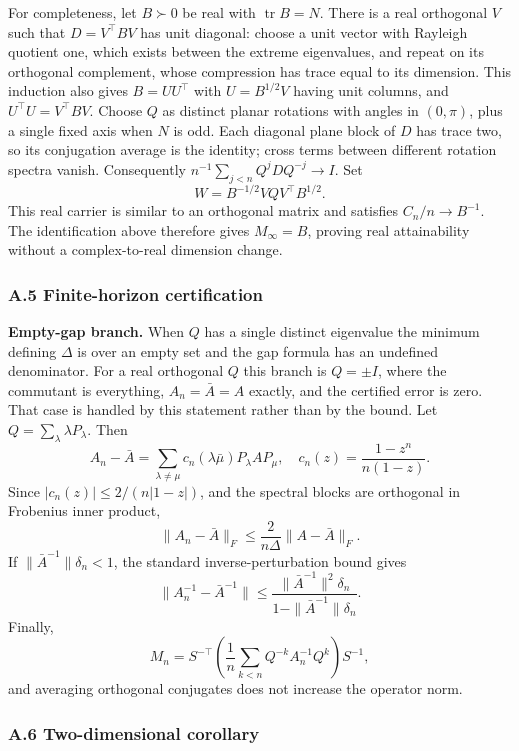 \documentclass[
  10pt,
]{article}
\begin{document}
For completeness, let \(B\succ0\) be real with \(\operatorname{tr}B=N\).
There is a real orthogonal \(V\) such that \(D=V^\top BV\) has unit
diagonal: choose a unit vector with Rayleigh quotient one, which exists
between the extreme eigenvalues, and repeat on its orthogonal
complement, whose compression has trace equal to its dimension. This
induction also gives \(B=UU^\top\) with \(U=B^{1/2}V\) having unit
columns, and \(U^\top U=V^\top BV\). Choose \(Q\) as distinct planar
rotations with angles in \((0,\pi)\), plus a single fixed axis when
\(N\) is odd. Each diagonal plane block of \(D\) has trace two, so its
conjugation average is the identity; cross terms between different
rotation spectra vanish. Consequently
\(n^{-1}\sum_{j<n}Q^jD Q^{-j}\to I\). Set \[
W=B^{-1/2}VQV^\top B^{1/2}.
\] This real carrier is similar to an orthogonal matrix and satisfies
\(C_n/n\to B^{-1}\). The identification above therefore gives
\(M_\infty=B\), proving real attainability without a complex-to-real
dimension change.

\subsubsection{A.5 Finite-horizon
certification}\label{a.5-finite-horizon-certification}

\textbf{Empty-gap branch.} When \(Q\) has a single distinct eigenvalue
the minimum defining \(\Delta\) is over an empty set and the gap formula
has an undefined denominator. For a real orthogonal \(Q\) this branch is
\(Q=\pm I\), where the commutant is everything, \(A_n=\bar A=A\)
exactly, and the certified error is zero. That case is handled by this
statement rather than by the bound. Let
\(Q=\sum_\lambda\lambda P_\lambda\). Then \[
A_n-\bar A
=
\sum_{\lambda\ne\mu}
c_n(\lambda\bar\mu)P_\lambda A P_\mu,
\quad
c_n(z)=\frac{1-z^n}{n(1-z)}.
\] Since \(|c_n(z)|\le2/(n|1-z|)\), and the spectral blocks are
orthogonal in Frobenius inner product, \[
\|A_n-\bar A\|_F
\le
\frac{2}{n\Delta}\|A-\bar A\|_F.
\] If \(\|\bar A^{-1}\|\delta_n<1\), the standard inverse-perturbation
bound gives \[
\|A_n^{-1}-\bar A^{-1}\|
\le
\frac{\|\bar A^{-1}\|^2\delta_n}
{1-\|\bar A^{-1}\|\delta_n}.
\] Finally, \[
M_n
=
S^{-\top}
\left(\frac1n\sum_{k<n}Q^{-k}A_n^{-1}Q^k\right)
S^{-1},
\] and averaging orthogonal conjugates does not increase the operator
norm.

\subsubsection{A.6 Two-dimensional
corollary}\label{a.6-two-dimensional-corollary}
\end{document}
